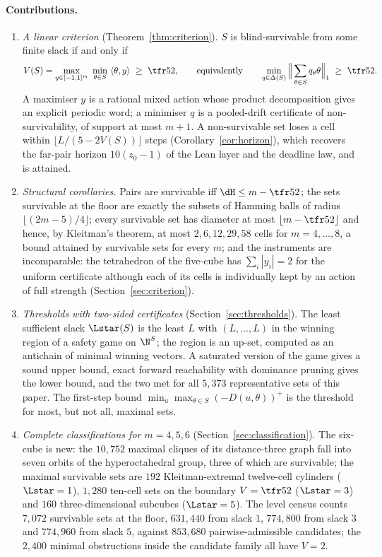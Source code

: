 \paragraph{Contributions.}
\begin{enumerate}[leftmargin=2em,itemsep=1pt]
\item \emph{A linear criterion} (Theorem~\ref{thm:criterion}). $S$ is blind-survivable from some finite slack if and only if
\[V(S)=\max_{y\in[-1,1]^m}\ \min_{\theta\in S}\ \langle\theta,y\rangle\ \ge\ \tfr52,\qquad\text{equivalently}\qquad \min_{q\in\Delta(S)}\Big\|\sum_{\theta\in S}q_\theta\theta\Big\|_1\ \ge\ \tfr52 .\]
A maximiser $y$ is a rational mixed action whose product decomposition gives an explicit periodic word; a minimiser $q$ is a pooled-drift certificate of non-survivability, of support at most $m+1$. A non-survivable set loses a cell within $\lfloor L/(5-2V(S))\rfloor$ steps (Corollary~\ref{cor:horizon}), which recovers the far-pair horizon $10(z_0-1)$ of the Lean layer and the deadline law, and is attained.
\item \emph{Structural corollaries.} Pairs are survivable iff $\dH\le m-\tfr52$; the sets survivable at the floor are exactly the subsets of Hamming balls of radius $\lfloor(2m-5)/4\rfloor$; every survivable set has diameter at most $\lfloor m-\tfr52\rfloor$ and hence, by Kleitman's theorem, at most $2,6,12,29,58$ cells for $m=4,\dots,8$, a bound attained by survivable sets for every $m$; and the instruments are incomparable: the tetrahedron of the five-cube has $\sum_i|y_i|=2$ for the uniform certificate although each of its cells is individually kept by an action of full strength (Section~\ref{sec:criterion}).
\item \emph{Thresholds with two-sided certificates} (Section~\ref{sec:thresholds}). The least sufficient slack $\Lstar(S)$ is the least $L$ with $(L,\dots,L)$ in the winning region of a safety game on $\N^S$; the region is an up-set, computed as an antichain of minimal winning vectors. A saturated version of the game gives a sound upper bound, exact forward reachability with dominance pruning gives the lower bound, and the two met for all $5{,}373$ representative sets of this paper. The first-step bound $\min_u\max_{\theta\in S}(-D(u,\theta))^+$ is the threshold for most, but not all, maximal sets.
\item \emph{Complete classifications for $m=4,5,6$} (Section~\ref{sec:classification}). The six-cube is new: the $10{,}752$ maximal cliques of its distance-three graph fall into seven orbits of the hyperoctahedral group, three of which are survivable; the maximal survivable sets are $192$ Kleitman-extremal twelve-cell cylinders ($\Lstar=1$), $1{,}280$ ten-cell sets on the boundary $V=\tfr52$ ($\Lstar=3$) and $160$ three-dimensional subcubes ($\Lstar=5$). The level census counts $7{,}072$ survivable sets at the floor, $631{,}440$ from slack $1$, $774{,}800$ from slack $3$ and $774{,}960$ from slack $5$, against $853{,}680$ pairwise-admissible candidates; the $2{,}400$ minimal obstructions inside the candidate family all have $V=2$.

\end{enumerate}
